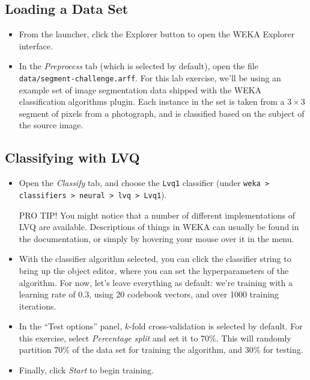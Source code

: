 \documentclass[11pt]{cselabheader}
\begin{document}
\subsection{Loading a Data Set}

\begin{itemize}[leftmargin=*]

\item From the launcher, click the Explorer button to open the WEKA Explorer interface.

\item In the \textit{Preprocess} tab (which is selected by default), open the file \texttt{data/segment-challenge.arff}. For this lab exercise, we'll be using an example set of image segmentation data shipped with the WEKA classification algorithms plugin. Each instance in the set is taken from a $3 \times 3$ segment of pixels from a photograph, and is classified based on the subject of the source image.

\end{itemize}

\subsection{Classifying with LVQ}

\begin{itemize}[leftmargin=*]

\item Open the \textit{Classify} tab, and choose the \texttt{Lvq1} classifier (under \texttt{weka > classifiers > neural > lvq > Lvq1}).

\begin{infobox}{PRO TIP!}
  You might notice that a number of different implementations of LVQ are
  available. Descriptions of things in WEKA can usually be found in the documentation, or simply
  by hovering your mouse over it in the menu.
\end{infobox}

\item With the classifier algorithm selected, you can click the classifier string to bring up the object editor, where you can set the hyperparameters of the algorithm. For now, let's leave everything as default: we're training with a learning rate of 0.3, using 20 codebook vectors, and over 1000 training iterations.

\item In the ``Test options'' panel, $k$-fold cross-validation is selected by default. For this exercise, select \textit{Percentage split} and set it to 70\%. This will randomly partition 70\% of the data set for training the algorithm, and 30\% for testing.

\item Finally, click \textit{Start} to begin training.

\end{itemize}
\end{document}
